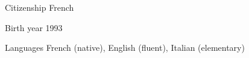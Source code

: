 
\begin{cvskills}

	\cvskill
	{Citizenship}
    {French}

	\cvskill
	{Birth year}
    {1993}

	\cvskill
	{Languages}
    {French (native), English (fluent), Italian (elementary)}

\end{cvskills}
